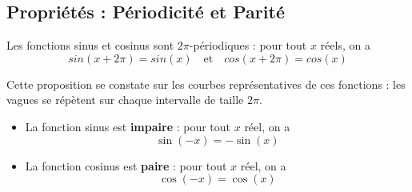 \documentclass{poly}
\begin{document}
\subsection{Propriétés : Périodicité et Parité}
\begin{proposition}
Les fonctions sinus et cosinus sont $2\pi$-périodiques : pour tout $x$ réels, on a 
\begin{equation*}
sin(x + 2\pi) = sin(x) \quad\mathrm{et}\quad cos(x + 2\pi) = cos(x)
\end{equation*}
\end{proposition}
\begin{remark}
Cette proposition se constate sur les courbes représentatives de ces fonctions : \og les vagues se répètent sur chaque intervalle de taille $2\pi$\fg.
\end{remark}
\begin{proposition}
\hfill
\begin{itemize}
\item La fonction sinus est \textbf{impaire} : pour tout $x$ réel, on a
\begin{equation*}
\sin(-x) = - \sin(x)
\end{equation*}
\item La fonction cosinus est \textbf{paire} : pour tout $x$ réel, on a
\begin{equation*}
\cos(-x) = \cos(x)
\end{equation*}
\end{itemize}
\end{proposition}
\end{document}
